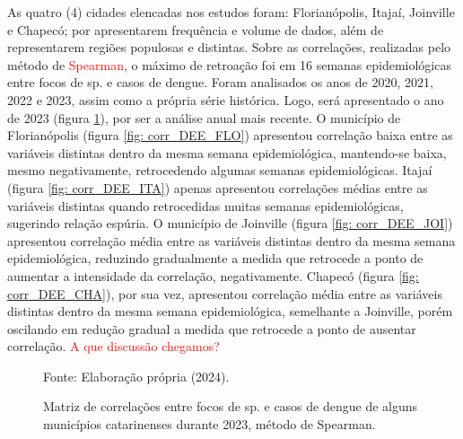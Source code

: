 \documentclass[
	12pt,				%
	openright,			%
	oneside,			%
	a4paper,			%
	english,			%
	french,				%
	spanish,			%
	brazil				%
	dvipsnames, table]{abntex2}
\begin{document}
\indent As quatro (4) cidades elencadas nos estudos foram: Florianópolis, Itajaí, Joinville e Chapecó; por apresentarem frequência e volume de dados, além de representarem regiões populosas e distintas. Sobre as correlações, realizadas pelo método de \textcolor{red}{Spearman}, o máximo de retroação foi em 16 semanas epidemiológicas entre focos de  sp. e casos de dengue. Foram analisados os anos de 2020, 2021, 2022 e 2023, assim como a própria série histórica. Logo, será apresentado o ano de 2023 (figura \ref{fig: matriz_corr_DEE}), por ser a análise anual mais recente. O município de Florianópolis (figura \ref{fig: corr_DEE_FLO}) apresentou correlação baixa entre as variáveis distintas dentro da mesma semana epidemiológica, mantendo-se baixa, mesmo negativamente, retrocedendo algumas semanas epidemiológicas. Itajaí (figura \ref{fig: corr_DEE_ITA}) apenas apresentou correlações médias entre as variáveis distintas quando retrocedidas muitas semanas epidemiológicas, sugerindo relação espúria. O município de Joinville (figura \ref{fig: corr_DEE_JOI}) apresentou correlação média entre as variáveis distintas dentro da mesma semana epidemiológica, reduzindo gradualmente a medida que retrocede a ponto de aumentar a intensidade da correlação, negativamente. Chapecó (figura \ref{fig: corr_DEE_CHA}), por sua vez, apresentou correlação média entre as variáveis distintas dentro da mesma semana epidemiológica, semelhante a Joinville, porém oscilando em redução gradual a medida que retrocede a ponto de ausentar correlação. \textcolor{red}{A que discussão chegamos?}

\begin{figure}[htbp]
    \begin{center}
    \caption{Matriz de correlações entre focos de  sp. e casos de dengue de alguns municípios catarinenses durante 2023, método de Spearman.}
    \label{fig: matriz_corr_DEE}
    \hfill
    \hfill
    \end{center}
    \small{Fonte: Elaboração própria (2024).}
\end{figure}
\end{document}
